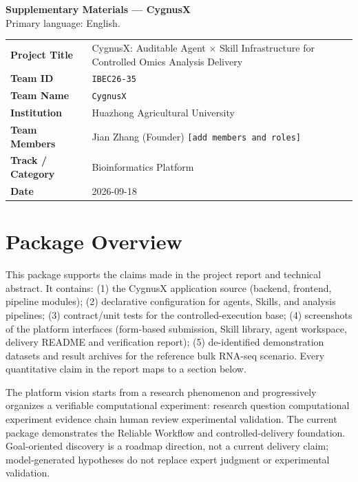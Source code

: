 \documentclass[11pt,a4paper]{article}
\begin{document}
\begin{center}
{\LARGE\bfseries Supplementary Materials --- CygnusX}\\[0.5em]
{\large Primary language: English.}\\[1.5em]
\end{center}

\begin{tabularx}{\textwidth}{>{\bfseries}p{}X}
\toprule
Project Title & CygnusX: Auditable Agent $\times$ Skill Infrastructure for Controlled Omics Analysis Delivery\\
Team ID & \texttt{IBEC26-35}\\
Team Name & \texttt{CygnusX}\\
Institution & Huazhong Agricultural University\\
Team Members & Jian Zhang (Founder) \texttt{[add members and roles]}\\
Track / Category & Bioinformatics Platform\\
Date & 2026-09-18\\
\bottomrule
\end{tabularx}

\section{Package Overview}

This package supports the claims made in the project report and technical abstract. It contains: (1) the CygnusX application source (backend, frontend, pipeline modules); (2) declarative configuration for agents, Skills, and analysis pipelines; (3) contract/unit tests for the controlled-execution base; (4) screenshots of the platform interfaces (form-based submission, Skill library, agent workspace, delivery README and verification report); (5) de-identified demonstration datasets and result archives for the reference bulk RNA-seq scenario. Every quantitative claim in the report maps to a section below.

The platform vision starts from a research phenomenon and progressively organizes a verifiable computational experiment: research question \textrightarrow computational experiment \textrightarrow evidence chain \textrightarrow human review \textrightarrow experimental validation. The current package demonstrates the Reliable Workflow and controlled-delivery foundation. Goal-oriented discovery is a roadmap direction, not a current delivery claim; model-generated hypotheses do not replace expert judgment or experimental validation.
\end{document}
